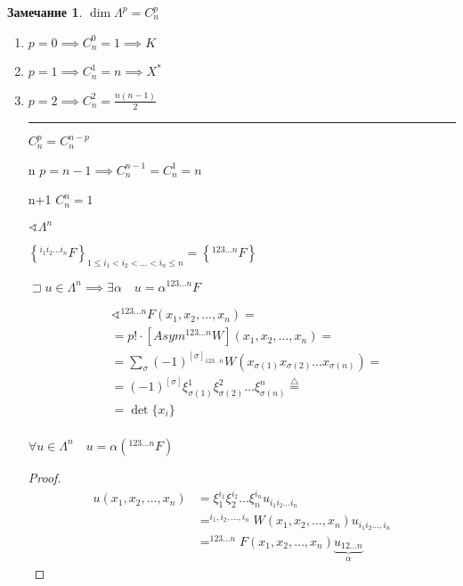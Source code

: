 \documentclass{book}
\theoremstyle{definition}
\newtheorem*{note}{Замечание}
\begin{document}
 \begin{note}
     $\dim \Lambda^p = C_n^p$

      \begin{enumerate}
         \item $p = 0 \implies  C_n^0 = 1 \implies  K$
         \item $p = 1 \implies  C_n^1 = n \implies  X^*$
         \item $p = 2 \implies  C_n^2 = \frac{n(n-1)}{2}$ 
             \\ \hrule
          $C_n^p = C_n^{n-p}$ 
      \item[n] $p = n-1 \implies  C_n^{n-1} = C_n^1 = n$
      \item[n+1] $C_n^n = 1$ 

          $\sphericalangle \Lambda^n$ 

          $\left\{^{i_1 i_2 \ldots i_n}F\right\}_{1\leqslant i_1 < i_2 < \ldots < i _n \leqslant  n} = \left\{ ^{123 \ldots n}F \right\} $ 

          $\sqsupset u\in \Lambda^n \implies  \exists \alpha \quad u = \alpha^{1 2 3 \ldots n}F$

        \begin{align*}
        &\sphericalangle ^{1 2 3\ldots n}F\left( x_1, x_2, \ldots, x_n \right)  =\\
        &=p!\cdot \left[Asym^{1 2 3\ldots n}W\right](x_1, x_2, \ldots, x_n) =\\
        &=\sum_{\sigma} (-1)^{[\sigma]_{1 2 3 \ldots n}}W\left( x_{\sigma(1)} x_{\sigma(2)} \ldots x_{\sigma(n)} \right)  =\\
        &=(-1)^{[\sigma]} \xi_{\sigma(1)}^{1} \xi_{\sigma(2)}^{2} \ldots \xi_{\sigma(n)}^{n} \overset{\triangle}=\\
        &=\det\{x_i\}\\
        \end{align*}


          \begin{lemma}
              $\forall u\in \Lambda^n\quad u = \alpha\left( ^{123 \ldots n}F \right) $
          \end{lemma}
          \begin{proof}
              \begin{align*}
                  u\left( x_1, x_2, \ldots, x_n \right) &=  \xi_1^{i_1}\xi_2^{i_2} \ldots \xi_n^{i_n} u_{i_1 i_2 \ldots i_n}\\
                  &= ^{i_1, i_2, \ldots, i_n}W\left( x_1, x_2, \ldots, x_n \right) u_{i_1 i_2\ldots, i_n}\\
                  & = ^{1 2 3 \ldots n}F(x_1, x_2, \ldots, x_n)\underbrace{u_{1 2 \ldots n}}\limits_{\alpha}
              \end{align*}                        
          \end{proof}
  \end{enumerate}


\end{note}
\end{document}
